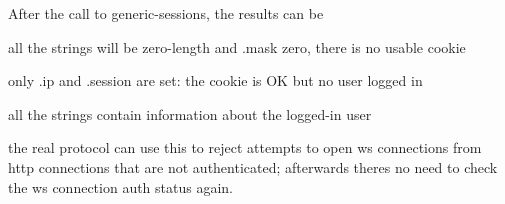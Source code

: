 After the call to generic-\/sessions, the results can be


\begin{DoxyItemize}
\item all the strings will be zero-\/length and .mask zero, there is no usable cookie
\begin{DoxyItemize}
\item only .ip and .session are set\+: the cookie is OK but no user logged in
\item all the strings contain information about the logged-\/in user
\end{DoxyItemize}
\end{DoxyItemize}

the real protocol can use this to reject attempts to open ws connections from http connections that are not authenticated; afterwards there\textquotesingle{}s no need to check the ws connection auth status again. 